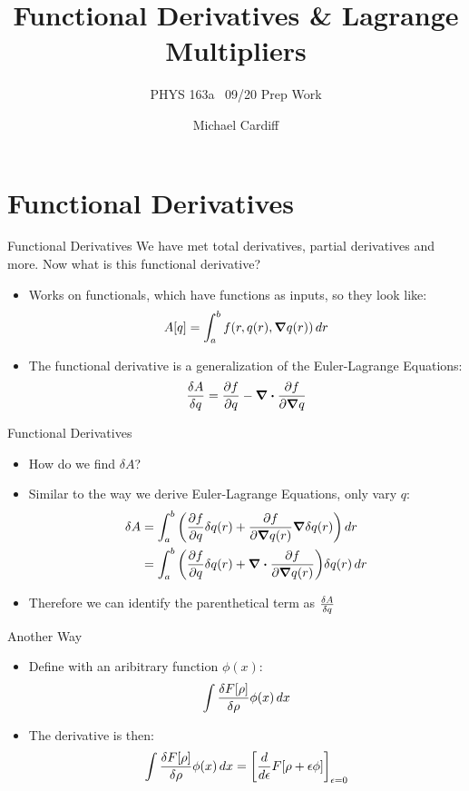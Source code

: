 \documentclass{beamer}
\title{Functional Derivatives \& Lagrange Multipliers}
\author{Michael Cardiff}
\subtitle{PHYS 163a \ 09/20 Prep Work}
\begin{document}
\begin{frame}
  \titlepage
\end{frame}
\section{Functional Derivatives}
\begin{frame}{Functional Derivatives}
  We have met total derivatives, partial derivatives and more. Now what is this functional derivative?
  \begin{itemize}
  \item Works on functionals, which have functions as inputs, so they look like:
    \begin{align*}
      A[q]=\int_a^b f(r,q(r),\grad{q(r)})\dd{r}
    \end{align*}
  \item The functional derivative is a generalization of the Euler-Lagrange Equations:
    \begin{align*}
      \fdv{A}{q}=\pdv{f}{q}-\div{\pdv{f}{\grad{q}}}
    \end{align*}
  \end{itemize}
\end{frame}
\begin{frame}{Functional Derivatives}
  \begin{itemize}
  \item How do we find $\delta A$?
  \item Similar to the way we derive Euler-Lagrange Equations, only vary $q$:
    \begin{align*}
      \delta A&=\int_a^b\qty(\pdv{f}{q}\delta q(r)+\pdv{f}{\grad{q(r)}}
      \grad{\delta q(r)})\dd{r}\\
      &=\int_a^b\qty(\pdv{f}{q}\delta q(r)+\div{\pdv{f}{\grad{q(r)}}})
      \delta q(r)\dd{r}
    \end{align*}
  \item Therefore we can identify the parenthetical term as $\fdv{A}{q}$
  \end{itemize}
\end{frame}
\begin{frame}{Another Way}
  \begin{itemize}
  \item Define with an aribitrary function $\phi(x)$:
    \begin{align*}
      \int\fdv{F[\rho]}{\rho}(x)\phi(x)\dd{x}
    \end{align*}
  \item The derivative is then:
    \begin{align*}
      \int\fdv{F[\rho]}{\rho}(x)\phi(x)\dd{x}=\qty[\dv{\epsilon}
      F[\rho+\epsilon\phi]]_{\epsilon=0}
    \end{align*}
  \end{itemize}
\end{frame}
\end{document}

